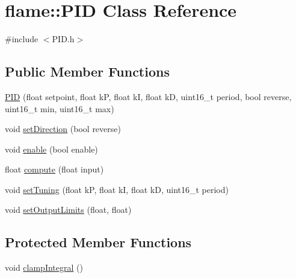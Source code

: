 \hypertarget{classflame_1_1_p_i_d}{\section{flame\-:\-:P\-I\-D Class Reference}
\label{classflame_1_1_p_i_d}
}


{\ttfamily \#include $<$P\-I\-D.\-h$>$}

\subsection*{Public Member Functions}
\begin{DoxyCompactItemize}
\item 
\hyperlink{classflame_1_1_p_i_d_a162fc0e59812f591ecef813d7fc7b435}{P\-I\-D} (float setpoint, float k\-P, float k\-I, float k\-D, uint16\-\_\-t period, bool reverse, uint16\-\_\-t min, uint16\-\_\-t max)
\item 
void \hyperlink{classflame_1_1_p_i_d_a66ca28c5a02174ee7110a6b26e5381ad}{set\-Direction} (bool reverse)
\item 
void \hyperlink{classflame_1_1_p_i_d_a2c7e7a6f3565d0b695a5d0a778403caa}{enable} (bool enable)
\item 
float \hyperlink{classflame_1_1_p_i_d_aa8a62b512ed815b1a63dd3f227ead5ac}{compute} (float input)
\item 
void \hyperlink{classflame_1_1_p_i_d_a47463b866776572720c1f9f623c9c11a}{set\-Tuning} (float k\-P, float k\-I, float k\-D, uint16\-\_\-t period)
\item 
void \hyperlink{classflame_1_1_p_i_d_a9169912fc05aa5edc4e78d33ebca2e3a}{set\-Output\-Limits} (float, float)
\end{DoxyCompactItemize}
\subsection*{Protected Member Functions}
\begin{DoxyCompactItemize}
\item 
void \hyperlink{classflame_1_1_p_i_d_a8adba7354f12d68571f8c8cabdd166eb}{clamp\-Integral} ()
\end{DoxyCompactItemize}
